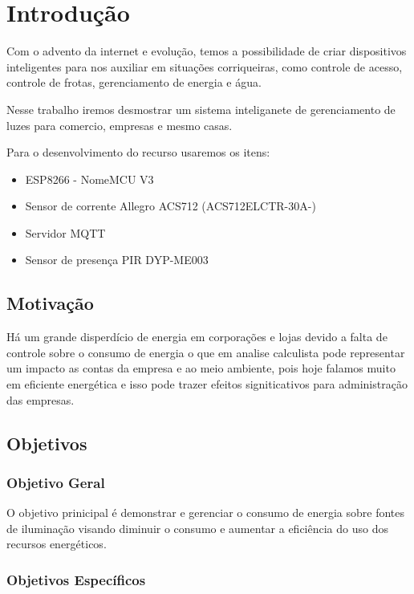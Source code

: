 \documentclass[openright]{normas-utf-tex} %
\begin{document}
\chapter{Introdução}

Com o advento da internet e evolução, temos a possibilidade de criar dispositivos inteligentes para nos auxiliar em situações corriqueiras, como controle de acesso, controle de frotas, gerenciamento de energia e água.

Nesse trabalho iremos desmostrar um sistema inteliganete de gerenciamento de luzes para comercio, empresas e mesmo casas.

Para o desenvolvimento do recurso usaremos os itens:

\begin{itemize}
       	\item ESP8266 - NomeMCU V3
        \item Sensor de corrente Allegro ACS712 (ACS712ELCTR-30A-)
        \item Servidor MQTT
        \item Sensor de presença PIR DYP-ME003
\end{itemize}
\section{Motivação}

Há um grande disperdício de energia em corporações e lojas devido  a falta de controle sobre o consumo de energia o que em analise calculista pode representar um impacto as contas da empresa e ao meio ambiente, pois hoje falamos muito em eficiente energética e isso pode trazer efeitos signiticativos para administração das empresas.

\section{Objetivos}

\subsection{Objetivo Geral}

O objetivo prinicipal é demonstrar e gerenciar o consumo de energia sobre fontes de iluminação visando diminuir o consumo e aumentar a eficiência do uso dos recursos energéticos. 

\subsection{Objetivos Específicos}
\end{document}
